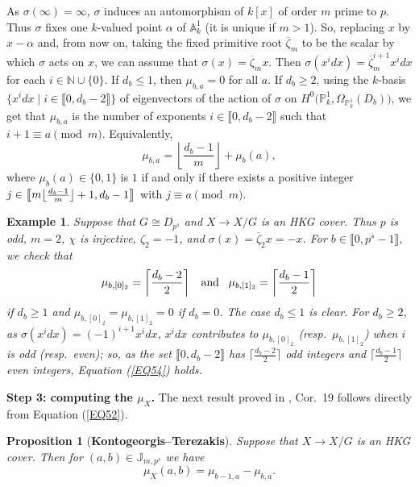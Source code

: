 \documentclass[11pt]{amsart}
\newtheorem{proposition}[theorem]{Proposition}
\newtheorem{ex}[theorem]{Example}
\begin{document}
As $\sigma(\infty)=\infty$, $\sigma$ induces an automorphism of $k[x]$ of order $m$ prime to $p$. Thus $\sigma$ fixes one $k$-valued point $\alpha$ of $\mathbb A^1_k$ (it is unique if $m>1$). So, replacing $x$ by $x-\alpha$ and, from now on, taking the fixed primitive root $\overline{\zeta}_m$ to be the scalar by which $\sigma$ acts on $x$, we can assume that $\sigma(x)=\overline{\zeta}_m x$. Then $\sigma(x^i dx)=\overline{\zeta}_m^{i+1}x^i dx$ for each $i\in\mathbb N\cup\{0\}$. If $d_b\le 1$, then $\mu_{b,a}=0$ for all $a$. If $d_b\ge 2$, using the $k$-basis $\{x^i dx\mid i\in\llbracket0,d_b-2\rrbracket\}$ of eigenvectors of the action of $\sigma$ on $H^0\bigl(\mathbb P_k^1,\Omega_{\mathbb P_k^1}(D_b)\bigr)$, we get that $\mu_{b,a}$ is the number of exponents $i\in\llbracket0,d_b-2\rrbracket$ such that $i+1\equiv a\pmod m$. Equivalently,
\begin{equation}\label{EQ53}
\mu_{b,a}=\left\lfloor\frac{d_b-1}{m}\right\rfloor+\mu_b(a),
\end{equation}
where $\mu_b(a)\in\{0,1\}$ is $1$ if and only if there exists a positive integer $\break j\in\bigl\llbracket m\bigl\lfloor\frac{d_b-1}{m}\bigr\rfloor+1,d_b-1\bigr\rrbracket$ with $j\equiv a\pmod m$.

\begin{ex}\normalfont\label{EX7}
Suppose that $G\cong D_{p^s}$ and $X\rightarrow X/G$ is an HKG cover. Thus $p$ is odd, $m=2$, $\chi$ is injective, $\zeta_2=-1$, and $\sigma(x)=\overline{\zeta}_2 x=-x$. For $b\in\llbracket0,p^s-1\rrbracket$, we check that 
\begin{equation}\label{EQ54}
\mu_{b,[0]_2}=\left\lceil\frac{d_b-2}{2}\right\rceil\;\;\;\textup{and}\;\;\;
\mu_{b,[1]_2}=\left\lceil\frac{d_b-1}{2}\right\rceil
\end{equation}
if $d_b\ge 1$ and $\mu_{b,[0]_2}=\mu_{b,[1]_2}=0$ if $d_b=0$. The case $d_b\le 1$ is clear. For $d_b\ge 2$, as $\sigma(x^i dx)=(-1)^{i+1}x^i dx$, $x^idx$ contributes to $\mu_{b,[0]_2}$ (resp.\ $\mu_{b,[1]_2}$) when $i$ is odd (resp.\ even); so, as the set $\llbracket0,d_b-2\rrbracket$ has $\lceil\frac{d_b-2}{2}\rceil$ odd integers and $\lceil\frac{d_b-1}{2}\rceil$ even integers, Equation (\ref{EQ54}) holds.
\end{ex}

{\bf Step 3: computing the $\mu_X$.} The next result proved in \cite{KT2}, Cor.\ 19 follows directly from Equation (\ref{EQ52}).

\begin{proposition}[{\bf Kontogeorgis--Terezakis}]
\label{P7}
Suppose that $X\rightarrow X/G$ is an HKG cover. Then for $(a,b)\in\mathbb J_{m,p^s}$ we have
\begin{equation}\label{EQ55}
\mu_X(a,b)=\mu_{b-1,a}-\mu_{b,a}.
\end{equation}
\end{proposition}
\end{document}
